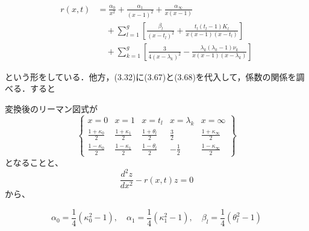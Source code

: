 \begin{story}
\begin{align}
    r(x,t) &= \frac{\alpha_0}{x^2} + \frac{\alpha_1}{(x-1)^2} + \frac{\alpha_\infty}{x(x-1)} \nonumber \\
    &\quad + \sum_{l=1}^g \left[ \frac{\beta_l}{(x-t_l)^2} + \frac{t_l(t_l-1)K_l}{x(x-1)(x-t_l)} \right] \label{eq:3.85} \\
    &\quad + \sum_{k=1}^g \left[ \frac{3}{4(x-\lambda_k)^2} - \frac{\lambda_k(\lambda_k-1)\nu_k}{x(x-1)(x-\lambda_k)} \right] \nonumber
\end{align}

という形をしている．他方，(3.32)に(3.67)と(3.68)を代入して，係数の関係を調べる．すると

変換後のリーマン図式が
\begin{equation*}
\left\{
\begin{array}{ccccc}
x=0 & x=1 & x=t_l & x=\lambda_k & x=\infty \\
\frac{1+\kappa_0}{2} & \frac{1+\kappa_1}{2} & \frac{1+\theta_l}{2} & \frac{3}{2} & \frac{1+\kappa_\infty}{2} \\
\frac{1-\kappa_0}{2} & \frac{1-\kappa_1}{2} & \frac{1-\theta_l}{2} & -\frac{1}{2} & \frac{1-\kappa_\infty}{2}
\end{array}
\right\}
\end{equation*}
となることと、
\begin{equation}
    \frac{d^2 z}{dx^2} - r(x,t)z = 0
\end{equation}
から、

\begin{equation*}
    \alpha_0 = \frac{1}{4}(\kappa_0^2 - 1), \quad \alpha_1 = \frac{1}{4}(\kappa_1^2 - 1), \quad \beta_l = \frac{1}{4}(\theta_l^2 - 1)
\end{equation*}


\end{story}
